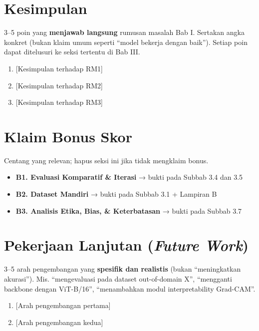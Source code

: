 \documentclass[11pt,a4paper,oneside]{report}
\begin{document}
\section{Kesimpulan}
\begin{petunjuk}
3--5 poin yang \textbf{menjawab langsung} rumusan masalah Bab I. Sertakan angka konkret (bukan klaim umum seperti ``model bekerja dengan baik''). Setiap poin dapat ditelusuri ke seksi tertentu di Bab III.
\end{petunjuk}

\begin{enumerate}[leftmargin=*]
    \item {[Kesimpulan terhadap RM1]}
    \item {[Kesimpulan terhadap RM2]}
    \item {[Kesimpulan terhadap RM3]}
\end{enumerate}

\section{Klaim Bonus Skor}
\begin{petunjuk}
Centang yang relevan; hapus seksi ini jika tidak mengklaim bonus.
\end{petunjuk}

\begin{itemize}[leftmargin=*]
    \item[$\square$] \textbf{B1. Evaluasi Komparatif \& Iterasi} → bukti pada Subbab 3.4 dan 3.5
    \item[$\square$] \textbf{B2. Dataset Mandiri} → bukti pada Subbab 3.1 + Lampiran B
    \item[$\square$] \textbf{B3. Analisis Etika, Bias, \& Keterbatasan} → bukti pada Subbab 3.7
\end{itemize}

\section{Pekerjaan Lanjutan (\textit{Future Work})}
\begin{petunjuk}
3--5 arah pengembangan yang \textbf{spesifik dan realistis} (bukan ``meningkatkan akurasi''). Mis. ``mengevaluasi pada dataset out-of-domain X'', ``mengganti backbone dengan ViT-B/16'', ``menambahkan modul interpretability Grad-CAM''.
\end{petunjuk}

\begin{enumerate}[leftmargin=*]
    \item {[Arah pengembangan pertama]}
    \item {[Arah pengembangan kedua]}
\end{enumerate}
\end{document}
